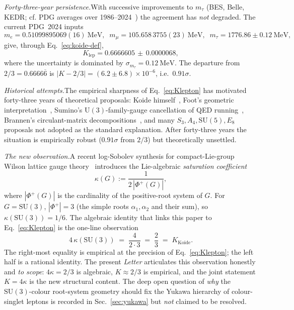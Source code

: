 \documentclass[aps,prl,reprint,amsmath,amssymb,nofootinbib,floatfix,superscriptaddress]{revtex4-2}
\newcommand{\SU}{\mathrm{SU}}
\newcommand{\Phiroots}{\Phi^{+}}
\begin{document}
\textit{Forty-three-year persistence.}\quad With successive improvements to $m_\tau$ (BES, Belle, KEDR; cf. PDG averages over 1986--2024~\cite{PDG2024}) the agreement has \emph{not} degraded. The current PDG~2024 inputs
\begin{equation*}
m_e = 0.51099895069(16)~\mathrm{MeV}, \;\; m_\mu = 105.658\,3755(23)~\mathrm{MeV}, \;\; m_\tau = 1776.86 \pm 0.12~\mathrm{MeV},
\end{equation*}
give, through Eq.~\eqref{eq:koide-def},
\begin{equation}
K_{\mathrm{lep}} = 0.6666605 \,\pm\, 0.0000068,
\label{eq:Klepton}
\end{equation}
where the uncertainty is dominated by $\sigma_{m_\tau} = 0.12~\mathrm{MeV}$. The departure from $2/3 = 0.6666\overline{6}$ is $|K - 2/3| = (6.2 \pm 6.8) \times 10^{-6}$, i.e.\ $0.91\sigma$.

\textit{Historical attempts.}\quad The empirical sharpness of Eq.~\eqref{eq:Klepton} has motivated forty-three years of theoretical proposals: Koide himself~\cite{Koide1983,Koide2007}, Foot's geometric interpretation~\cite{Foot1994}, Sumino's $\mathrm{U}(3)$-family-gauge cancellation of QED running~\cite{Sumino2009a,Sumino2009b}, Brannen's circulant-matrix decompositions~\cite{Brannen2006}, and many $S_3, A_4, \SU(5), E_8$ proposals not adopted as the standard explanation. After forty-three years the situation is empirically robust ($0.91\sigma$ from $2/3$) but theoretically unsettled.

\textit{The new observation.}\quad A recent log-Sobolev synthesis for compact-Lie-group Wilson lattice gauge theory~\cite{Remondiere2026a,Remondiere2026b} introduces the Lie-algebraic \emph{saturation coefficient}
\begin{equation}
\kappa(G) := \frac{1}{2 \, |\Phiroots(G)|},
\label{eq:kappa-def}
\end{equation}
where $|\Phiroots(G)|$ is the cardinality of the positive-root system of $G$. For $G = \SU(3)$, $|\Phiroots| = 3$ (the simple roots $\alpha_1, \alpha_2$ and their sum), so $\kappa(\SU(3)) = 1/6$. The algebraic identity that links this paper to Eq.~\eqref{eq:Klepton} is the one-line observation
\begin{equation}
\boxed{\; 4\,\kappa(\SU(3)) \;=\; \frac{4}{2 \cdot 3} \;=\; \frac{2}{3} \;=\; K_{\mathrm{Koide}}.\;}
\label{eq:central}
\end{equation}
The right-most equality is empirical at the precision of Eq.~\eqref{eq:Klepton}; the left half is a rational identity. The present \textit{Letter} articulates this observation honestly and \emph{to scope}: $4\kappa = 2/3$ is algebraic, $K \approx 2/3$ is empirical, and the joint statement $K = 4\kappa$ is the new structural content. The deep open question of \emph{why} the $\SU(3)$-colour root-system geometry should fix the Yukawa hierarchy of colour-singlet leptons is recorded in Sec.~\ref{sec:yukawa} but \emph{not} claimed to be resolved.
\end{document}
